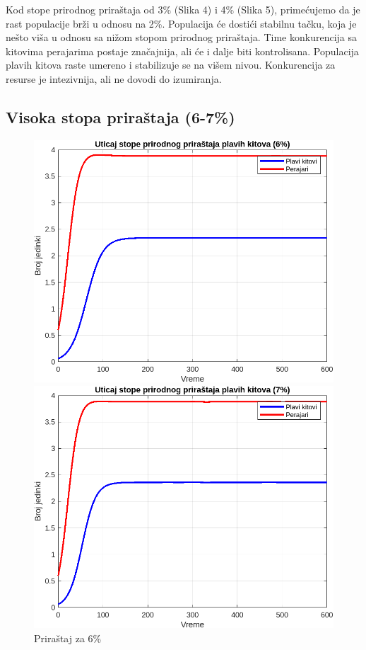 \documentclass[a4paper]{article}
\begin{document}
{	Kod stope prirodnog priraštaja od 3\% (Slika 4) i 4\% (Slika 5), primećujemo da je rast populacije brži u odnosu na 2\%. Populacija će dostići stabilnu tačku, koja je nešto viša u odnosu sa nižom stopom prirodnog priraštaja. Time konkurencija sa kitovima perajarima postaje značajnija, ali će i dalje biti kontrolisana. Populacija plavih kitova raste umereno i stabilizuje se na višem nivou. Konkurencija za resurse je intezivnija, ali ne dovodi do izumiranja.
	
	\newpage
	
	\subsection{Visoka stopa priraštaja (6-7\%)}
	
	\begin{figure}[h]
		\centering
		\begin{minipage}[h]{0.45\linewidth}
			\centering
			\includegraphics[width=\textwidth]{uticaj6.png}
			\caption{Priraštaj za 6\%}
			\label{slika1: uticaj6}
		\end{minipage}
		\hspace{0.5cm} 
		\begin{minipage}[h]{0.45\linewidth}
			\centering
			\includegraphics[width=\textwidth]{uticaj7.png} 

\end{minipage}
\end{figure}}
\end{document}
